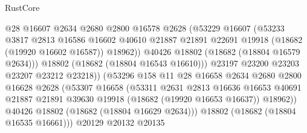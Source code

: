 \begin{lexlean}{RustCore}
\begin{coremodule}
                                  @28
                                  @16607
                                  @2634
                                  @2680
                                  @2800
                                  @16578
                                  @2628
                                  (@53229
                                    @16607
                                    (@53233
                                      @3817
                                      @2813
                                      @16586
                                      @16602
                                      @40610
                                      @21887
                                      @21891
                                      @22691
                                      @19918
                                      (@18682 (@19920 @16602 @16587))
                                      @18962))
                                  @40426
                                  @18802
                                  (@18682 (@18804 @16579 @2634)))
                                @18802
                                (@18682 (@18804 @16543 @16610)))
                              @23197
                              @23200
                              @23203
                              @23207
                              @23212
                              @23218))
                          (@53296
                            @158
                            @11
                            @28
                            @16658
                            @2634
                            @2680
                            @2800
                            @16628
                            @2628
                            (@53307
                              @16658
                              (@53311
                                @2631
                                @2813
                                @16636
                                @16653
                                @40691
                                @21887
                                @21891
                                @39630
                                @19918
                                (@18682 (@19920 @16653 @16637))
                                @18962))
                            @40426
                            @18802
                            (@18682 (@18804 @16629 @2634)))
                          @18802
                          (@18682 (@18804 @16535 @16661)))
                        @20129
                        @20132
                        @20135

\end{coremodule}
\end{lexlean}
